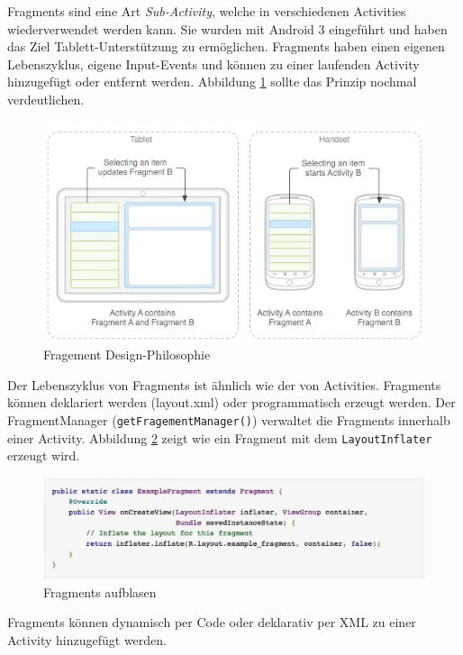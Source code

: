 Fragments sind eine Art \emph{Sub-Activity}, welche in verschiedenen Activities wiederverwendet werden kann. Sie wurden mit Android 3 eingeführt und haben das Ziel Tablett-Unterstützung zu ermöglichen. Fragments haben einen eigenen Lebenszyklus, eigene Input-Events und können zu einer laufenden Activity hinzugefügt oder entfernt werden. Abbildung \ref{fig:fragment-design} sollte das Prinzip nochmal verdeutlichen.

\begin{figure}
\centering
\includegraphics[width=0.7\linewidth]{fig/fragment-design}
\caption{Fragement Design-Philosophie}
\label{fig:fragment-design}
\end{figure}

Der Lebenszyklus von Fragments ist ähnlich wie der von Activities. Fragments können deklariert werden (layout.xml) oder programmatisch erzeugt werden. Der FragmentManager (\texttt{getFragementManager()}) verwaltet die Fragments innerhalb einer Activity. Abbildung \ref{fig:fragement-aufblasen} zeigt wie ein Fragment mit dem \texttt{LayoutInflater} erzeugt wird.

\begin{figure}
\centering
\includegraphics[width=0.7\linewidth]{fig/fragement-aufblasen}
\caption{Fragments aufblasen}
\label{fig:fragement-aufblasen}
\end{figure}

Fragments können dynamisch per Code oder deklarativ per XML zu einer Activity hinzugefügt werden.

